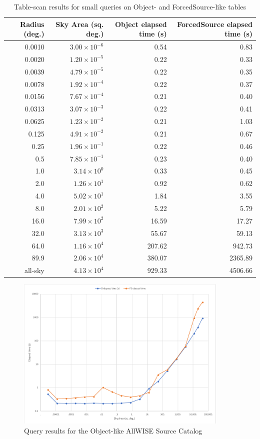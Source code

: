 \begin{table}[h]
\centering
\begin{tabular}{r r r r}
Radius (deg.) & Sky Area (sq. deg.) & Object elapsed time (s) & ForcedSource elapsed time (s) \\ \hline
0.0010 & $3.00\times 10^{-6}$ & 0.54 & 0.83 \\
0.0020 & $1.20\times 10^{-5}$ & 0.22 & 0.33 \\
0.0039 & $4.79\times 10^{-5}$ & 0.22 & 0.35 \\
0.0078 & $1.92\times 10^{-4}$ & 0.22 & 0.37 \\
0.0156 & $7.67\times 10^{-4}$ & 0.21 & 0.40 \\
0.0313 & $3.07\times 10^{-3}$ & 0.22 & 0.41 \\
0.0625 & $1.23\times 10^{-2}$ & 0.21 & 1.03 \\
0.125 & $4.91\times 10^{-2}$ & 0.21 & 0.67 \\
0.25 & $1.96\times 10^{-1}$ & 0.22 & 0.46 \\
0.5 & $7.85\times 10^{-1}$ & 0.23 & 0.40 \\
1.0 & $3.14\times 10^{0}$ & 0.33 & 0.45 \\
2.0 & $1.26\times 10^{1}$ & 0.92 & 0.62 \\
4.0 & $5.02\times 10^{1}$ & 1.84 & 3.55 \\
8.0 & $2.01\times 10^{2}$ & 5.22 & 5.79 \\
16.0 & $7.99\times 10^{2}$ & 16.59 & 17.27 \\
32.0 & $3.13\times 10^{3}$ & 55.67 & 59.13 \\
64.0 & $1.16\times 10^{4}$ & 207.62 & 942.73 \\
89.9 & $2.06\times 10^{4}$ & 380.07 & 2365.89 \\
all-sky & $4.13\times 10^{4}$ & 929.33 & 4506.66
\end{tabular}
\caption{Table-scan results for small queries on Object- and ForcedSource-like tables}
\label{tab:lsp-00-10-simple-scan-timings}
\end{table}

\begin{figure}
  \centering
  \includegraphics[width=4in]{lsp-00-10/SimpleScans.png}
  \caption{Query results for the Object-like AllWISE Source Catalog}
  \label{fig:lsp-00-10-simple-scan-plot}
\end{figure}

